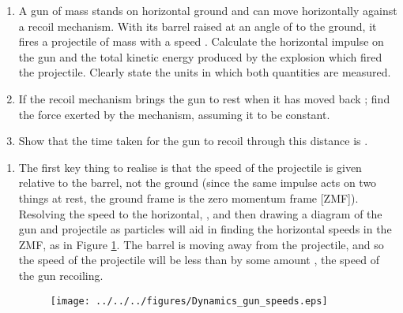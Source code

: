 
\begin{problem}[A1972AMIIQ2l] %
{\begin{enumerate}
	\item A gun of mass  stands on horizontal ground and can move horizontally against a recoil mechanism. With its barrel raised at an angle of  to the ground, it fires a projectile of mass  with a speed  . Calculate the horizontal impulse on the gun and the total kinetic energy produced by the explosion which fired the projectile. Clearly state the units in which both quantities are measured.
	\item If the recoil mechanism brings the gun to rest when it has moved back ; find the force exerted by the mechanism, assuming it to be constant.
	\item Show that the time taken for the gun to recoil through this distance is .
\end{enumerate}
}
{}
{\begin{enumerate}
	\item The first key thing to realise is that the speed of the projectile is given relative to the barrel, not the ground (since the same impulse acts on two things at rest, the ground frame is the zero momentum frame [ZMF]). Resolving the speed to the horizontal, , and then drawing a diagram of the gun and projectile as particles will aid in finding the horizontal speeds in the ZMF, as in Figure \ref{fig:Dynamics_gun_speeds}. The barrel is moving away from the projectile, and so the speed of the projectile will be less than  by some amount , the speed of the gun recoiling.

\begin{figure}[h]
\centering
\texttt{[image: ../../../figures/Dynamics\_gun\_speeds.eps]}
\caption{}
\label{fig:Dynamics_gun_speeds}
\end{figure}


\end{enumerate}}
\end{problem}
